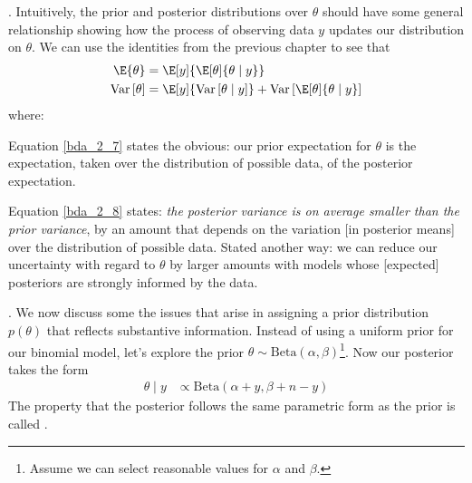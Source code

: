 \documentclass[11pt]{article}
\newcommand\p{\Needspace{10\baselineskip} \noindent}
\newcommand\Var[1]{\mathrm{Var}\left[#1\right]}
\begin{document}
\p {}. Intuitively, the prior and posterior distributions over $\theta$ should have some general relationship showing how the process of observing data $y$ updates our distribution on $\theta$. We can use the identities from the previous chapter to see that 
\begin{align}
	\E{\theta} &= \E[y]{\E[\theta]{\theta \mid y}} \label{bda_2_7} \\
	\Var{\theta} &= \E[y]{\Var{\theta \mid y}} + \Var{ \E[\theta]{\theta \mid y} } \label{bda_2_8}
\end{align}
where:
\begin{compactitem}[$\rightarrow$]
	\item Equation \ref{bda_2_7} states the obvious: our prior expectation for $\theta$ is the expectation, taken over the distribution of possible data, of the posterior expectation. 
	\item Equation \ref{bda_2_8} states: \textit{the posterior variance is on average smaller than the prior variance}, by an amount that depends on the variation [in posterior means] over the distribution of possible data. Stated another way: we can reduce our uncertainty with regard to $\theta$ by larger amounts with models whose [expected] posteriors are strongly informed by the data. 
\end{compactitem}


\p {}. We now discuss some the issues that arise in assigning a prior distribution $p(\theta)$ that reflects substantive information. Instead of using a uniform prior for our binomial model, let's explore the prior $\theta \sim \text{Beta}(\alpha, \beta)$\footnote{Assume we can select reasonable values for $\alpha$ and $\beta$.}. Now our posterior takes the form
\begin{align}
	\theta \mid y &\propto \text{Beta}(\alpha + y, \beta + n - y)
\end{align}
The property that the posterior follows the same parametric form as the prior is called . 
\end{document}
